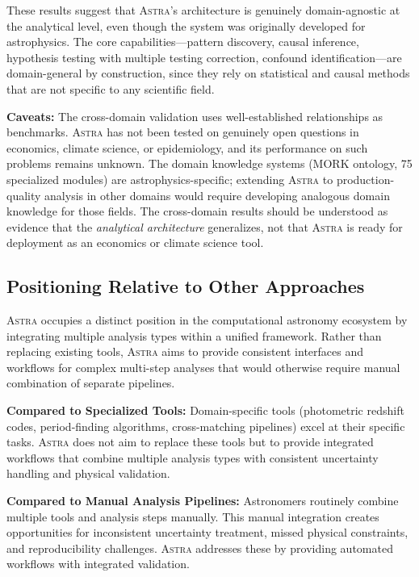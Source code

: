 \documentclass[fleqn,usenatbib]{mnras}
\newcommand{\astra}{\textsc{Astra}\xspace}
\begin{document}
These results suggest that \astra's architecture is genuinely domain-agnostic at the analytical level, even though the system was originally developed for astrophysics.
The core capabilities---pattern discovery, causal inference, hypothesis testing with multiple testing correction, confound identification---are domain-general by construction, since they rely on statistical and causal methods that are not specific to any scientific field.

\textbf{Caveats:}
The cross-domain validation uses well-established relationships as benchmarks. \astra has not been tested on genuinely open questions in economics, climate science, or epidemiology, and its performance on such problems remains unknown.
The domain knowledge systems (MORK ontology, 75 specialized modules) are astrophysics-specific; extending \astra to production-quality analysis in other domains would require developing analogous domain knowledge for those fields.
The cross-domain results should be understood as evidence that the \emph{analytical architecture} generalizes, not that \astra is ready for deployment as an economics or climate science tool.

\subsection{Positioning Relative to Other Approaches}
\label{sec:discussion:positioning}

\astra occupies a distinct position in the computational astronomy ecosystem by integrating multiple analysis types within a unified framework.
Rather than replacing existing tools, \astra aims to provide consistent interfaces and workflows for complex multi-step analyses that would otherwise require manual combination of separate pipelines.

\textbf{Compared to Specialized Tools:}
Domain-specific tools (photometric redshift codes, period-finding algorithms, cross-matching pipelines) excel at their specific tasks.
\astra does not aim to replace these tools but to provide integrated workflows that combine multiple analysis types with consistent uncertainty handling and physical validation.

\textbf{Compared to Manual Analysis Pipelines:}
Astronomers routinely combine multiple tools and analysis steps manually.
This manual integration creates opportunities for inconsistent uncertainty treatment, missed physical constraints, and reproducibility challenges.
\astra addresses these by providing automated workflows with integrated validation.
\end{document}
